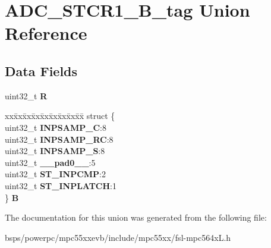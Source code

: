 \hypertarget{unionADC__STCR1__32B__tag}{}\section{A\+D\+C\+\_\+\+S\+T\+C\+R1\+\_\+B\+\_\+tag Union Reference}
\label{unionADC__STCR1__32B__tag}
\subsection*{Data Fields}
\begin{DoxyCompactItemize}
\item 
\mbox{\label{unionADC__STCR1__32B__tag_a73c93d65993693f34736454027501bed}} 
uint32\+\_\+t {\bfseries R}
\item 
\mbox{\label{unionADC__STCR1__32B__tag_abb1a5d2c4354cf2cfb20a61f0101a814}} 
\begin{tabbing}
xx\=xx\=xx\=xx\=xx\=xx\=xx\=xx\=xx\=\kill
struct \{\\
\>uint32\_t {\bfseries INPSAMP\_C}:8\\
\>uint32\_t {\bfseries INPSAMP\_RC}:8\\
\>uint32\_t {\bfseries INPSAMP\_S}:8\\
\>uint32\_t {\bfseries \_\_pad0\_\_}:5\\
\>uint32\_t {\bfseries ST\_INPCMP}:2\\
\>uint32\_t {\bfseries ST\_INPLATCH}:1\\
\} {\bfseries B}\\

\end{tabbing}\end{DoxyCompactItemize}


The documentation for this union was generated from the following file\+:\begin{DoxyCompactItemize}
\item 
bsps/powerpc/mpc55xxevb/include/mpc55xx/fsl-\/mpc564x\+L.\+h\end{DoxyCompactItemize}
